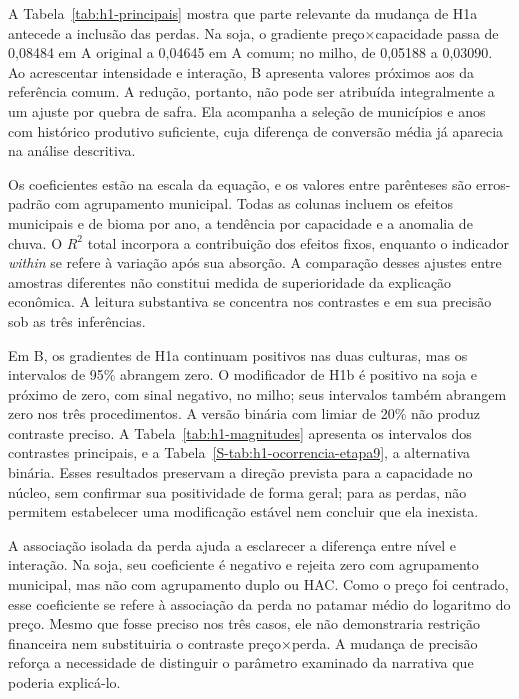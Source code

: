 A Tabela~\ref{tab:h1-principais} mostra que parte relevante da mudança de H1a antecede a inclusão das perdas. Na soja, o gradiente preço×capacidade passa de 0,08484 em A original a 0,04645 em A comum; no milho, de 0,05188 a 0,03090. Ao acrescentar intensidade e interação, B apresenta valores próximos aos da referência comum. A redução, portanto, não pode ser atribuída integralmente a um ajuste por quebra de safra. Ela acompanha a seleção de municípios e anos com histórico produtivo suficiente, cuja diferença de conversão média já aparecia na análise descritiva.



Os coeficientes estão na escala da equação, e os valores entre parênteses são erros-padrão com agrupamento municipal. Todas as colunas incluem os efeitos municipais e de bioma por ano, a tendência por capacidade e a anomalia de chuva. O $R^2$ total incorpora a contribuição dos efeitos fixos, enquanto o indicador \textit{within} se refere à variação após sua absorção. A comparação desses ajustes entre amostras diferentes não constitui medida de superioridade da explicação econômica. A leitura substantiva se concentra nos contrastes e em sua precisão sob as três inferências.

Em B, os gradientes de H1a continuam positivos nas duas culturas, mas os intervalos de 95\% abrangem zero. O modificador de H1b é positivo na soja e próximo de zero, com sinal negativo, no milho; seus intervalos também abrangem zero nos três procedimentos. A versão binária com limiar de 20\% não produz contraste preciso. A Tabela~\ref{tab:h1-magnitudes} apresenta os intervalos dos contrastes principais, e a Tabela~\ref{S-tab:h1-ocorrencia-etapa9}, a alternativa binária. Esses resultados preservam a direção prevista para a capacidade no núcleo, sem confirmar sua positividade de forma geral; para as perdas, não permitem estabelecer uma modificação estável nem concluir que ela inexista.

\FloatBarrier
A associação isolada da perda ajuda a esclarecer a diferença entre nível e interação. Na soja, seu coeficiente é negativo e rejeita zero com agrupamento municipal, mas não com agrupamento duplo ou HAC. Como o preço foi centrado, esse coeficiente se refere à associação da perda no patamar médio do logaritmo do preço. Mesmo que fosse preciso nos três casos, ele não demonstraria restrição financeira nem substituiria o contraste preço×perda. A mudança de precisão reforça a necessidade de distinguir o parâmetro examinado da narrativa que poderia explicá-lo.

